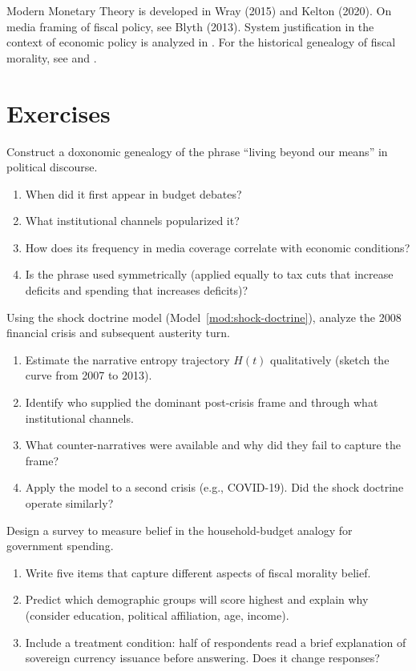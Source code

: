 Modern Monetary Theory is developed in Wray (2015) and Kelton (2020).
On media framing of fiscal policy, see Blyth (2013).
System justification in the context of economic policy is analyzed in \textcite{jost2004}.
For the historical genealogy of fiscal morality, see \textcite{graeber2011} and \textcite{piketty2014}.

\section{Exercises}

\begin{exercise}
Construct a doxonomic genealogy of the phrase ``living beyond our means'' in political discourse.
\begin{enumerate}[nosep]
  \item When did it first appear in budget debates?
  \item What institutional channels popularized it?
  \item How does its frequency in media coverage correlate with economic conditions?
  \item Is the phrase used symmetrically (applied equally to tax cuts that increase deficits and spending that increases deficits)?
\end{enumerate}
\end{exercise}

\begin{exercise}
Using the shock doctrine model (Model~\ref{mod:shock-doctrine}), analyze the 2008 financial crisis and subsequent austerity turn.
\begin{enumerate}[nosep]
  \item Estimate the narrative entropy trajectory $H(t)$ qualitatively (sketch the curve from 2007 to 2013).
  \item Identify who supplied the dominant post-crisis frame and through what institutional channels.
  \item What counter-narratives were available and why did they fail to capture the frame?
  \item Apply the model to a second crisis (e.g., COVID-19). Did the shock doctrine operate similarly?
\end{enumerate}
\end{exercise}

\begin{exercise}
Design a survey to measure belief in the household-budget analogy for government spending.
\begin{enumerate}[nosep]
  \item Write five items that capture different aspects of fiscal morality belief.
  \item Predict which demographic groups will score highest and explain why (consider education, political affiliation, age, income).
  \item Include a treatment condition: half of respondents read a brief explanation of sovereign currency issuance before answering. Does it change responses?
\end{enumerate}
\end{exercise}

